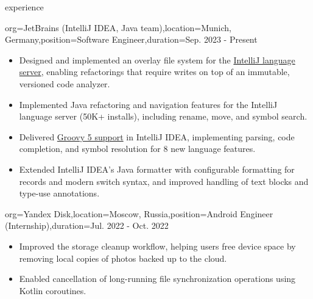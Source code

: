 \documentclass{resume}
\begin{document}
\makeheader

\begin{ResumeSection}{experience}
	\begin{ResumeSubsection}{org=JetBrains (IntelliJ IDEA{,} Java team),location={Munich, Germany},position={Software Engineer},duration=Sep. 2023 - Present}
        \begin{itemize}
            \item Designed and implemented an overlay file system for the \href{https://www.jetbrains.com/idea/extension/?extension=vscode}{IntelliJ language server}, enabling refactorings that require writes on top of an immutable, versioned code analyzer.
            \item Implemented Java refactoring and navigation features for the IntelliJ language server (50K+ installs), including rename, move, and symbol search.
            \item Delivered \href{https://www.jetbrains.com/help/idea/groovy.html}{Groovy 5 support} in IntelliJ IDEA, implementing parsing, code completion, and symbol resolution for 8 new language features.
            \item Extended IntelliJ IDEA's Java formatter with configurable formatting for records and modern switch syntax, and improved handling of text blocks and type-use annotations.
        \end{itemize}
    \end{ResumeSubsection}
	\begin{ResumeSubsection}{org=Yandex Disk,location={Moscow, Russia},position={Android Engineer (Internship)},duration=Jul. 2022 - Oct. 2022} 
        \begin{itemize}
            \item Improved the storage cleanup workflow, helping users free device space by removing local copies of photos backed up to the cloud.
            \item Enabled cancellation of long-running file synchronization operations using Kotlin coroutines.
        \end{itemize}
    \end{ResumeSubsection}
\end{ResumeSection}
\end{document}
